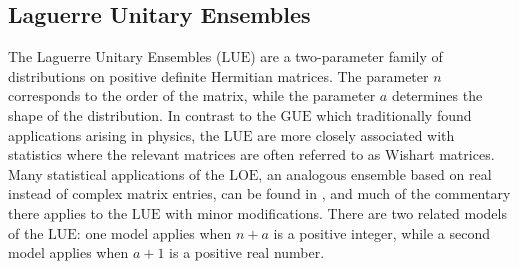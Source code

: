 \documentclass[pdftex, oneside, 10pt, letterpaper]{amsart}
\theoremstyle{plain}
\theoremstyle{definition}
\theoremstyle{remark}
\begin{document}
\subsection*{Laguerre Unitary Ensembles}\label{sec:Laguerre}

The Laguerre Unitary Ensembles ({\ensuremath{\mathrm{LUE}}}) are a two-parameter family of
distributions on positive definite Hermitian matrices.  The parameter
$n$ corresponds to the order of the matrix, while the parameter $a$
determines the shape of the distribution.  In contrast to the {\ensuremath{\mathrm{GUE}}}{}
which traditionally found applications arising in physics, the {\ensuremath{\mathrm{LUE}}}{}
are more closely associated with statistics where the relevant
matrices are often referred to as Wishart matrices.  Many statistical
applications of the {\ensuremath{\mathrm{LOE}}}{}, an analogous ensemble based on real
instead of complex matrix entries, can be found in \cite{Muirhead},
and much of the commentary there applies to the {\ensuremath{\mathrm{LUE}}}{} with minor
modifications.  There are two related models of the {\ensuremath{\mathrm{LUE}}}{}: one model
applies when $n+a$ is a positive integer, while a second model applies
when $a+1$ is a positive real number.
\end{document}
